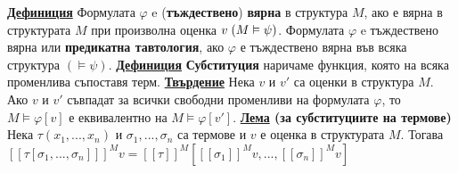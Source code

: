 \documentclass{article}
\begin{document}
\textbf{\underline{Дефиниция}}
Формулата $\varphi$ e (\textbf{тъждествено}) \textbf{вярна} в структура $M$, ако е вярна в структурата $M$ при произволна оценка $v \hspace{0.1cm} (M \vDash \psi)$.
Формулата $\varphi$ e тъждествено вярна или \textbf{предикатна тавтология}, ако $\varphi$ е тъждествено вярна във всяка структура $(\vDash \psi)$. \newline\newline
\textbf{\underline{Дефиниция}}
\textbf{Субституция} наричаме функция, която на всяка променлива съпоставя терм. \newline\newline
\textbf{\underline{Твърдение}} \newline
Нека $v$ и $v'$ са оценки в структура $M$. Ако $v$ и $v'$ съвпадат за всички свободни променливи на формулата $\varphi$, то $M \vDash \varphi[v]$
е еквивалентно на $M \vDash \varphi[v']$. \newline\newline
\textbf{\underline{Лема} (за субституциите на термове)} \newline
Нека $\tau(x_1, ..., x_n)$ и $\sigma_1, ..., \sigma_n$ са термове и $v$ е оценка в структурата $M$. Тогава $[[\tau[\sigma_1, ..., \sigma_n]]]^Mv = 
[[\tau]]^M[[[\sigma_1]]^Mv, ..., [[\sigma_n]]^Mv]$
\end{document}
